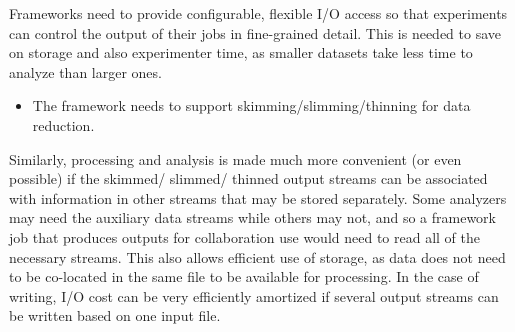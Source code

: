 \documentclass[../main-v1.tex]{subfiles}
\begin{document}





Frameworks need to provide configurable, flexible I/O access so that experiments can control the output of their jobs in fine-grained detail.  This is needed to save on storage and also experimenter time, as smaller datasets take less time to analyze than larger ones.
 
\begin{itemize}
\item The framework needs to support skimming/slimming/thinning for data reduction.
\end{itemize}

Similarly, processing and analysis is made much more convenient (or even possible) if the skimmed/ slimmed/ thinned output streams can be associated with information in other streams that may be stored separately.  Some analyzers may need the auxiliary data streams while others may not, and so a framework job that produces outputs for collaboration use would need to read all of the necessary streams.  This also allows efficient use of storage, as data does not need to be co-located in the same file to be available for processing.  In the case of writing, I/O cost can be very efficiently amortized if several output streams can be written based on one input file.
\end{document}
